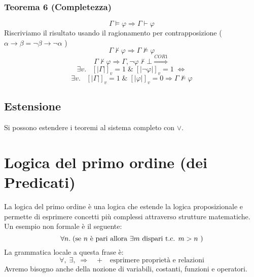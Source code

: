\documentclass{article}
\theoremstyle{break}
\theoremstyle{break}
\theoremstyle{break}
\theoremstyle{break}
\begin{document}
\subsubsection{Teorema 6 (Completezza)}
\[
\Gamma \models \varphi \Rightarrow \Gamma \vdash \varphi
\] 
Riscriviamo il risultato usando il ragionamento per contrapposizione (\( \alpha \to \beta = \neg \beta \to \neg \alpha \) )
\[
\Gamma \not\vdash \varphi \Rightarrow \Gamma \not\models \varphi
\] 
\[
  \Gamma \not\vdash \varphi \Rightarrow \Gamma,\neg \varphi \not\vdash \bot \stackrel{COR1}{\Rightarrow}
\] 
\[
  \exists v.\;\;\; [|\Gamma|]_v=1 \;\&\; [|\neg \varphi|]_v=1 \; \Leftrightarrow
\] 
\[
  \exists v.\;\;\; [|\Gamma|]_v=1\; \&\; [|\varphi|]_v=0 \Rightarrow \Gamma \not\models \varphi
\] 

\subsection{Estensione}
Si possono estendere i teoremi al sistema completo con \( \vee \).

\section{Logica del primo ordine (dei Predicati)}
La logica del primo ordine è una logica che estende la logica proposizionale 
e permette di esprimere concetti più complessi attraverso strutture matematiche.
Un esempio non formale è il seguente:
\[
  \forall n.\; (\text{se \( n \) è pari allora \( \exists m \) dispari t.c. \( m>n \)  })
\] 
La grammatica locale a questa frase è:
\[
  \forall,\; \exists,\; \Rightarrow\;\;\;+\;\;\;\text{esprimere proprietà e relazioni}
\] 
Avremo bisogno anche della nozione di variabili, costanti, funzioni e operatori.
\end{document}
